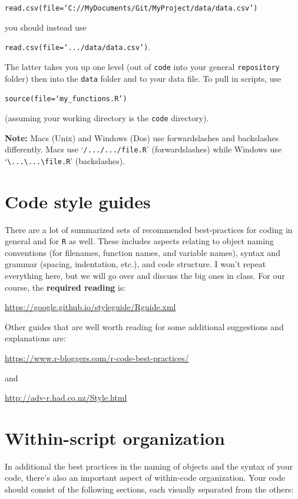 \documentclass[12pt,letterpaper]{article}
\begin{document}
\texttt{read.csv(file=`C://MyDocuments/Git/MyProject/data/data.csv')}

you should instead use

\texttt{read.csv(file=`.../data/data.csv')}.

The latter takes you up one level (out of \texttt{code} into your general \texttt{repository} folder) then into the \texttt{data} folder and to your data file.  To pull in scripts, use

\texttt{source(file=`my\_functions.R')}

(assuming your working directory is the \texttt{code} directory).

\textbf{Note:} Macs (Unix) and Windows (Dos) use forwardslashes and backslashes differently.  Macs use `\texttt{/.../.../file.R}' (forwardslashes) while Windows use `\texttt{\textbackslash...\textbackslash...\textbackslash file.R}' (backslashes).


\section{Code style guides} \label{codestyleguide}
There are a lot of summarized sets of recommended best-practices for coding in general and for \texttt{R} as well.  These includes aspects relating to object naming conventions (for filenames, function names, and variable names), syntax and grammar (spacing, indentation, etc.), and code structure.  I won't repeat everything here, but we will go over and discuss the big ones in class.  For our course, the \textbf{required reading} is:

\url{https://google.github.io/styleguide/Rguide.xml}

Other guides that are well worth reading for some additional suggestions and explanations are:

\url{https://www.r-bloggers.com/r-code-best-practices/}

and

\url{http://adv-r.had.co.nz/Style.html}


\section{Within-script organization}
In additional the best practices in the naming of objects and the syntax of your code, there's also an important aspect of within-code organization. Your code should consist of the following sections, each visually separated from the others:
\end{document}
